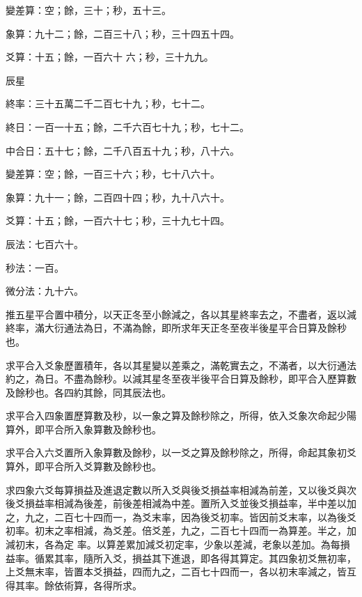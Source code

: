 \begin{pinyinscope}
 變差算：空；餘，三十；秒，五十三。



 象算：九十二；餘，二百三十八；秒，三十四五十四。



 爻算：十五；餘，一百六十
 六；秒，三十九九。



 辰星



 終率：三十五萬二千二百七十九；秒，七十二。



 終日：一百一十五；餘，二千六百七十九；秒，七十二。



 中合日：五十七；餘，二千八百五十九；秒，八十六。



 變差算：空；餘，一百三十六；秒，七十八六十。



 象算：九十一；餘，二百四十四；秒，九十八六十。



 爻算：十五；餘，一百六十七；秒，三十九七十四。



 辰法：七百六十。



 秒法：一百。



 微分法：九十六。



 推五星平合置中積分，以天正冬至小餘減之，各以其星終率去之，不盡者，返以減終率，滿大衍通法為日，不滿為餘，即所求年天正冬至夜半後星平合日算及餘秒也。



 求平合入爻象歷置積年，各以其星變以差乘之，滿乾實去之，不滿者，以大衍通法約之，為日。不盡為餘秒。以減其星冬至夜半後平合日算及餘秒，即平合入歷算數及餘秒也。各四約其餘，同其辰法也。



 求平合入四象置歷算數及秒，以一象之算及餘秒除之，所得，依入爻象次命起少陽算外，即平合所入象算數及餘秒也。



 求平合入六爻置所入象算數及餘秒，以一爻之算及餘秒除之，所得，命起其象初爻算外，即平合所入爻算數及餘秒也。



 求四象六爻每算損益及進退定數以所入爻與後爻損益率相減為前差，又以後爻與次後爻損益率相減為後差，前後差相減為中差。置所入爻並後爻損益率，半中差以加之，九之，二百七十四而一，為爻末率，因為後爻初率。皆因前爻末率，以為後爻初率。初末之率相減，為爻差。倍爻差，九之，二百七十四而一為算差。半之，加減初末，各為定
 率。以算差累加減爻初定率，少象以差減，老象以差加。為每損益率。循累其率，隨所入爻，損益其下進退，即各得其算定。其四象初爻無初率，上爻無末率，皆置本爻損益，四而九之，二百七十四而一，各以初末率減之，皆互得其率。餘依術算，各得所求。




\end{pinyinscope}
